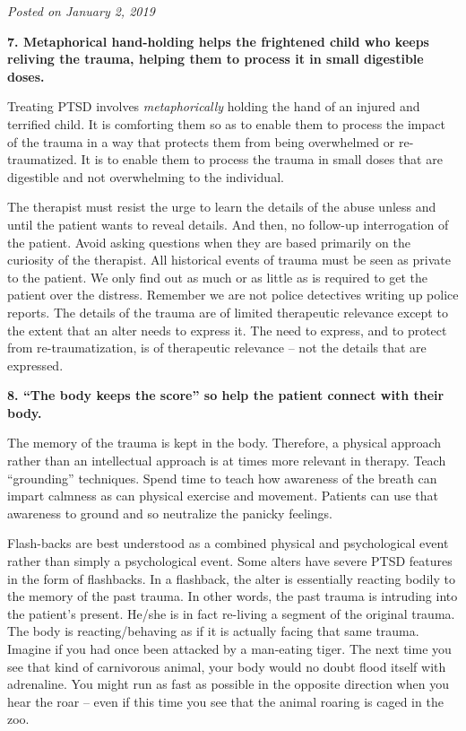 \documentclass[]{book}
\begin{document}
\emph{Posted on January 2, 2019}

\textbf{7. Metaphorical hand-holding helps the frightened child who keeps reliving the trauma, helping them to process it in small digestible doses.}

Treating PTSD involves \emph{metaphorically} holding the hand of an injured and terrified child. It is comforting them so as to enable them to process the impact of the trauma in a way that protects them from being overwhelmed or re-traumatized. It is to enable them to process the trauma in small doses that are digestible and not overwhelming to the individual.

The therapist must resist the urge to learn the details of the abuse unless and until the patient wants to reveal details. And then, no follow-up interrogation of the patient. Avoid asking questions when they are based primarily on the curiosity of the therapist. All historical events of trauma must be seen as private to the patient. We only find out as much or as little as is required to get the patient over the distress. Remember we are not police detectives writing up police reports. The details of the trauma are of limited therapeutic relevance except to the extent that an alter needs to express it. The need to express, and to protect from re-traumatization, is of therapeutic relevance -- not the details that are expressed.

\textbf{8. ``The body keeps the score'' so help the patient connect with their body.}

The memory of the trauma is kept in the body. Therefore, a physical approach rather than an intellectual approach is at times more relevant in therapy. Teach ``grounding'' techniques. Spend time to teach how awareness of the breath can impart calmness as can physical exercise and movement. Patients can use that awareness to ground and so neutralize the panicky feelings.

Flash-backs are best understood as a combined physical and psychological event rather than simply a psychological event. Some alters have severe PTSD features in the form of flashbacks. In a flashback, the alter is essentially reacting bodily to the memory of the past trauma. In other words, the past trauma is intruding into the patient's present. He/she is in fact re-living a segment of the original trauma. The body is reacting/behaving as if it is actually facing that same trauma. Imagine if you had once been attacked by a man-eating tiger. The next time you see that kind of carnivorous animal, your body would no doubt flood itself with adrenaline. You might run as fast as possible in the opposite direction when you hear the roar -- even if this time you see that the animal roaring is caged in the zoo.
\end{document}
